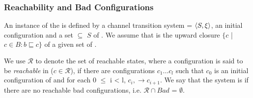 \subsubsection{Reachability and Bad Configurations}
\label{bad}
An instance of the  is defined by a channel transition system  = $\langle S,\xi\rangle$, an initial configuration  and a set  $\subseteq$ $S$ of . We assume that  is the upward closure $\{c$ | $ c \in B: b \sqsubseteq c\}$ of a given  set of .

We use $\mathcal{R}$ to denote the set of reachable states, where a configuration  is said to be \emph{reachable} in  ($c \in \mathcal{R}$), if there are configurations $c_1...c_l$ such that $c_0$ is an initial configuration of  and for each 0 $\leq$ i < l, $c_i, \rightarrow c_{i+1}$.  We say that the system  is  if there are no reachable bad configurations, i.e.  $\mathcal{R} \cap Bad$  = $\emptyset$.
